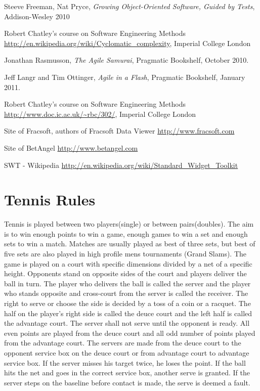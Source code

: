 \documentclass[10pt]{report}
\begin{document}
\begin{thebibliography}{9}
  Steeve Freeman, Nat Pryce,
  \emph{Growing Object-Oriented Software, Guided by Tests}, Addison-Wesley 2010

  Robert Chatley's course on Software Engineering Methods
  \url{http://en.wikipedia.org/wiki/Cyclomatic_complexity},
  Imperial College London

  Jonathan Rasmusson,
  \emph{The Agile Samurai},
  Pragmatic Bookshelf,
  October 2010.

  Jeff Langr and Tim Ottinger,
  \emph{Agile in a Flash},
  Pragmatic Bookshelf, 
  January 2011.

  Robert Chatley's course on Software Engineering Methods
  \url{http://www.doc.ic.ac.uk/~rbc/302/},
  Imperial College London

  Site of Fracsoft, authors of Fracsoft Data Viewer
  \url{http://www.fracsoft.com}

  Site of BetAngel
  \url{http://www.betangel.com}
  
  SWT - Wikipedia
  \url{http://en.wikipedia.org/wiki/Standard_Widget_Toolkit}

\end{thebibliography}

\clearpage
\appendix

\chapter{Tennis Rules}

Tennis is played between two players(single) or between pairs(doubles).
The aim is to win enough points to win a game, enough games to win
a set and enough sets to win a match. Matches are usually played as best of three
sets, but best of five sets are also played in high profile mens tournaments (Grand
Slams). 
The game is played on a court with specific dimensions divided by a net of a specific height.
Opponents stand on opposite sides of the court and players deliver the ball in turn.
The player who delivers the ball is called the server and the player who stands opposite and cross-court from the server
is called the receiver. 
The right to serve or choose the side is decided by a toss of a coin or a racquet.
The half on the player's right side is called the deuce court and the left half is called the advantage court. 
The server shall not serve until the opponent is ready. All even points are played from the deuce court and 
all odd number of points played from the advantage court. The servers are made from the deuce court to the opponent service box
on the deuce court or from advantage court to advantage service box. If the server misses his target twice, he loses the point. 
If the ball hits the net and goes in the correct service box, another serve is granted. If the server steps on the baseline before contact is made, 
the serve is deemed a fault. 
\end{document}
